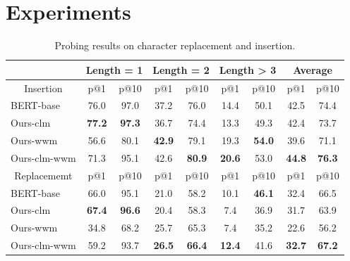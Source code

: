\documentclass[11pt]{article}
\begin{document}
\section{Experiments}
\begin{table*}[htbp]
\small
  \centering
    \begin{tabular}{l|cc|cc|cc|cc}
    \toprule
           & \multicolumn{2}{c|}{Length = 1} & \multicolumn{2}{c|}{Length = 2} & \multicolumn{2}{c|}{Length > 3} & \multicolumn{2}{c}{Average} \\
    \midrule
    \multicolumn{1}{c|}{Insertion}& p@1 & p@10 & p@1 & p@10 & p@1 & p@10 & p@1 & p@10 \\
    \midrule
    BERT-base       & 76.0    & 97.0    & 37.2  & 76.0    & 14.4  & 50.1  & 42.5 & 74.4 \\
    Ours-clm  & \textbf{77.2}  & \textbf{97.3}  & 36.7  & 74.4  & 13.3  & 49.3  & 42.4  & 73.7 \\
    Ours-wwm    & 56.6  & 80.1  & \textbf{42.9}  & 79.1  & 19.3  & \textbf{54.0}   & 39.6  & 71.1 \\
    Ours-clm-wwm       & 71.3  & 95.1  & 42.6  & \textbf{80.9}  & \textbf{20.6}  & 53.0    & \textbf{44.8} & \textbf{76.3} \\
    \midrule
    \multicolumn{1}{c|}{Replacememt} & p@1 & p@10 & p@1 & p@10 & p@1 & p@10 & p@1 & p@10  \\
    \midrule
    BERT-base       & 66.0    & 95.1  & 21.0    & 58.2  & 10.1  & \textbf{46.1}  & 32.4 & 66.5 \\
    Ours-clm  & \textbf{67.4}  & \textbf{96.6}  & 20.4  & 58.3  & 7.4   & 36.9  & 31.7 & 63.9 \\
    Ours-wwm      & 34.8  & 68.2  & 25.7  & 65.3  & 7.4   & 35.2  & 22.6 & 56.2 \\
    Ours-clm-wwm    & 59.2  & 93.7  & \textbf{26.5}  & \textbf{66.4}  & \textbf{12.4}  & 41.6  & \textbf{32.7} & \textbf{67.2} \\
    
    \bottomrule
    \end{tabular}%
  \caption{Probing results on character replacement and insertion. }
  \label{tab:probing}%
\end{table*}%
\end{document}
